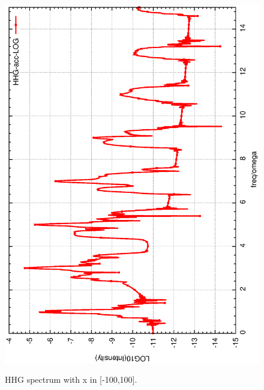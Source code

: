 \documentclass{isildur}
\begin{document}
\begin{itemize}
\begin{figure}[htbp]
{{{\includegraphics[width=\linewidth]{fig1b.eps}} }}
\caption{HHG spectrum with x in [-100,100].
 }
\end{figure}
\begin{figure}[htbp]
\centering
\mbox{}
\end{figure}
\end{itemize}
\end{document}
